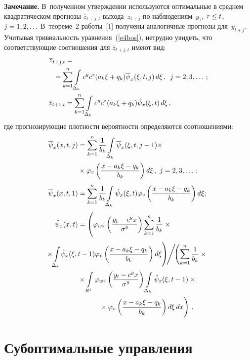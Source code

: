 \begin{multicols}{2}
  \noindent
  \textbf{Замечание.} В~полученном утверждении используются оптимальные в среднем 
квадратическом прогнозы $\overline{z}_{t+j,t}$ выхода~$z_{t+j}$ по наблюдениям~$y_\tau$, 
$\tau\hm\leq t$, $j\hm=1,2,\ldots$ В~теореме~2 работы~[1] получены аналогичные прогнозы 
для~$y_{t+j}$. Учитывая тривиальность уравнения~(\ref{e4bos}), нетрудно увидеть, что 
соответствующие соотношения для $\overline{z}_{t+j,t}$ имеют вид:
  \begin{align*}
  \overline{z}_{t+j,t} &=\\
  &\hspace*{-17pt}{}=\sum\limits_{k=1}^n \int\limits_{\Delta_k} c^y c^z (a_k\xi 
+q_k)\overline{\psi}_x (\xi, t,j)\,d\xi\,,\enskip j=2,3,\ldots\,;\\
  \overline{z}_{t+1,t} &=\sum\limits_{k=1}^n \int\limits_{\Delta_k} c^y c^z 
  (a_k\xi +q_k)\hat{\psi}_x (\xi, t)\,d\xi\,,
  \end{align*}
где прогнозирующие плотности вероятности определяются соотношениями:
\begin{align*}
\overline{\psi}_x (x,t,j)&=\sum\limits_{k=1}^n 
\fr{1}{b_k}\int\limits_{\Delta_k}\overline{\psi}_x(\xi,t,j-1){}\times\\[1pt]
&{}\times\varphi_v\left( \fr{x-a_k\xi- q_k}{b_k}\right)d\xi\,,\ j=2,3,\ldots\,;\\[3pt]
\overline{\psi}_x (x,t,1)&=
\sum\limits_{k=1}^n \fr{1}{b_k}\!\int\limits_{\Delta_k}\hat{\psi}_x(\xi,t)\varphi_v\left( \fr{x-
a_k\xi-q_k}{b_k}\right)d\xi;\\[3pt]
\hat{\psi}_x(x,t) &=\left(
\vphantom{\int\limits_{\Delta_k}}\varphi_{w^y}\left( \fr{y_t-c^yx}{\sigma^y}\right)
\sum\limits_{k=1}^n 
\fr{1}{b_k}\times{}\right.\\[1pt]
&\hspace*{-49.25456pt}\left.{}\times\! \int\limits_{\Delta_k}\! \hat{\psi}_x(\xi,t-1)\varphi_v
\left( \fr{x-a_k\xi-
q_k}{b_k}\right)d\xi\right)\!\!\Bigg /\!\!
\left(\sum\limits_{k=1}^n \fr{1}{b_k}\times{}\right.\\[1pt]
&{}\times\int\limits_{R^1}
\varphi_{w^y}\left( \fr{y_t-
c^yx}{\sigma^y}\right)\int\limits_{\Delta_k}\hat{\psi}_x(\xi,t-1)\times{}\\[1pt]
&\hspace*{10mm}\left.{}\times\varphi_v\left( \fr{x-a_k\xi-
q_k}{b_k}\right ) d\xi\,dx
\vphantom{\sum\limits_{k=1}^{n}}
\right)\,.
\end{align*}


\section{Субоптимальные управления}
  

\end{multicols}
